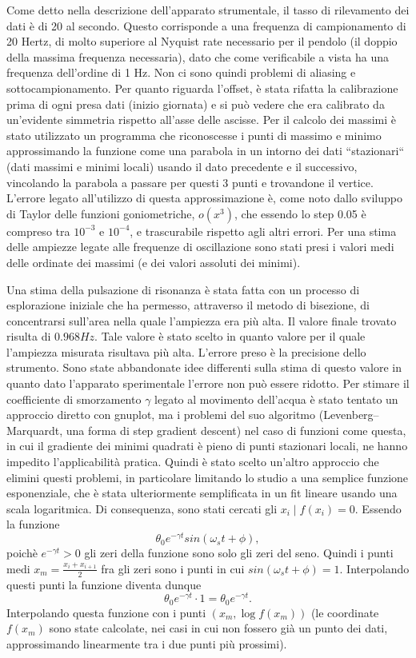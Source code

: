 Come detto nella descrizione dell'apparato strumentale, il tasso di rilevamento dei dati è di 20 al secondo. Questo corrisponde a una
frequenza di campionamento di 20 Hertz, di molto superiore al 
Nyquist rate necessario per il pendolo (il doppio della massima frequenza
necessaria), dato che come verificabile a vista ha una frequenza dell'ordine di 1 Hz. 
Non ci sono quindi problemi di aliasing e sottocampionamento.
Per quanto riguarda l'offset, è stata rifatta la calibrazione prima di ogni presa dati (inizio giornata) e si può vedere che era
 calibrato da un'evidente simmetria rispetto all'asse delle ascisse.
Per il calcolo dei massimi è stato utilizzato un programma che riconoscesse i punti di massimo e minimo approssimando
la funzione come una parabola in un intorno dei dati ``stazionari`` (dati massimi e minimi locali) usando il dato precedente e il successivo,
vincolando la parabola a passare per questi 3 punti e trovandone il vertice. L'errore legato all'utilizzo
 di questa approssimazione è, come noto dallo sviluppo di Taylor delle funzioni goniometriche, $o(x^3)$, che essendo lo step 0.05 è compreso tra $10^{-3}$ e $10^{-4}$,
  e trascurabile rispetto agli altri errori.
 Per una stima delle ampiezze legate alle frequenze di oscillazione sono stati presi i valori medi delle ordinate dei massimi (e dei valori assoluti dei minimi).

Una stima della pulsazione di risonanza è stata fatta con un processo di esplorazione iniziale che ha permesso, attraverso
il metodo di bisezione, di concentrarsi sull'area nella quale l'ampiezza era più alta. Il valore finale trovato risulta di $0.968 Hz$.
 Tale valore è stato scelto in quanto valore per il quale l'ampiezza misurata risultava più alta. L'errore preso è la precisione dello
 strumento. Sono state abbandonate idee differenti sulla stima di questo valore in quanto dato l'apparato sperimentale l'errore non
 può essere ridotto.
Per stimare il coefficiente di smorzamento $\gamma$ legato al movimento dell'acqua è stato tentato un approccio diretto con gnuplot, ma i problemi del suo algoritmo 
(Levenberg–Marquardt, una forma di step gradient descent) nel caso di funzioni come questa, in cui il gradiente dei minimi quadrati è pieno di punti 
stazionari locali, ne hanno impedito l'applicabilità pratica. Quindi è stato scelto un'altro approccio che elimini questi problemi, in particolare limitando lo
studio a una semplice funzione esponenziale, che è stata ulteriormente semplificata in un fit lineare usando una scala logaritmica.
Di consequenza, sono stati cercati gli $x_i \mid f(x_i)=0$. Essendo la funzione
\begin{equation}
	\theta_0 e^{-\gamma t} sin(\omega_s t + \phi),
\end{equation}
poichè $e^{-\gamma t} > 0$ gli zeri della funzione sono solo gli zeri del seno. Quindi i punti medi 
$x_m = \frac{x_i + x_{i+1}}{2}$ fra gli zeri sono i punti in cui $sin(\omega_s t + \phi) = 1$.
Interpolando questi punti la funzione diventa dunque
\[
	\theta_0 e^{-\gamma t} \cdot 1 = \theta_0 e^{-\gamma t}.
\]
Interpolando questa funzione con i punti $(x_m,\log{f(x_m)})$ (le coordinate $f(x_m)$ sono state calcolate, nei casi in cui non fossero già un punto dei dati,
approssimando linearmente tra i due punti più prossimi).

